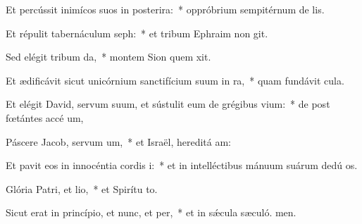 \item Et percússit inimícos suos in posterira:~* oppróbrium sempitérnum de lis.
\item Et répulit tabernáculum seph:~* et tribum Ephraim non git.
\item Sed elégit tribum da,~* montem Sion quem xit.
\item Et ædificávit sicut unicórnium sanctifícium suum in ra,~* quam fundávit  cula.
\item Et elégit David, servum suum, et sústulit eum de grégibus vium:~* de post fœtántes accé um,
\item Páscere Jacob, servum um,~* et Israël, hereditá am:
\item Et pavit eos in innocéntia cordis i:~* et in intelléctibus mánuum suárum dedú os.
\item Glória Patri, et lio,~* et Spirítu to.
\item Sicut erat in princípio, et nunc, et per,~* et in sǽcula sæculó. men.
